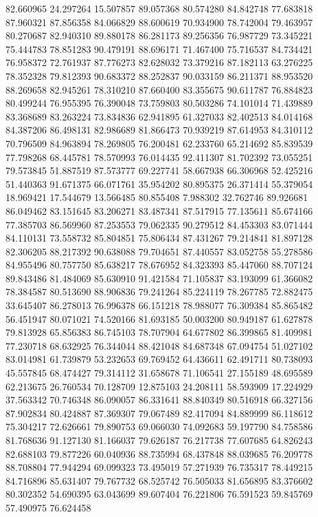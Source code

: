82.660965
24.297264
15.507857
89.057368
80.574280
84.842748
77.683818
87.960321
87.856358
84.066829
88.600619
70.934900
78.742004
79.463957
80.270687
82.940310
89.880178
86.281173
89.256356
76.987729
73.345221
75.444783
78.851283
90.479191
88.696171
71.467400
75.716537
84.734421
76.958372
72.761937
87.776273
82.628032
73.379216
87.182113
63.276225
78.352328
79.812393
90.683372
88.252837
90.033159
86.211371
88.953520
88.269658
82.945261
78.310210
87.660400
83.355675
90.611787
76.884823
80.499244
76.955395
76.390048
73.759803
80.503286
74.101014
71.439889
83.368689
83.263224
73.834836
62.941895
61.327033
82.402513
84.014168
84.387206
86.498131
82.986689
81.866473
70.939219
87.614953
84.310112
70.796509
84.963894
78.269805
76.200481
62.233760
65.214692
85.839539
77.798268
68.445781
78.570993
76.014435
92.411307
81.702392
73.055251
79.573845
51.887519
87.573777
69.227741
58.667938
66.306968
52.425216
51.440363
91.671375
66.071761
35.954202
80.895375
26.371414
55.379054
18.969421
17.544679
13.566485
80.855408
7.988302
32.762746
89.926681
86.049462
83.151645
83.206271
83.487341
87.517915
77.135611
85.674166
77.385703
86.569960
87.253553
79.062335
90.279512
84.453303
83.071444
84.110131
73.558732
85.804851
75.806434
87.431267
79.214841
81.897128
82.306205
88.217392
90.638088
79.704651
87.440557
83.052758
55.278586
84.955496
80.757750
85.638217
78.676952
84.323393
85.447060
88.707124
89.843486
81.484069
85.630910
91.421584
71.105837
83.193099
61.366082
78.384587
80.513690
88.906836
79.241264
85.224119
78.267785
72.882475
33.645407
86.278013
76.996378
66.151218
78.988077
76.309384
85.865482
56.451947
80.071021
74.520166
81.693185
50.003200
80.949187
61.627878
79.813928
65.856383
86.745103
78.707904
64.677802
86.399865
81.409981
77.230718
68.632925
76.344044
88.421048
84.687348
67.094754
51.027102
83.014981
61.739879
53.232653
69.769452
64.436611
62.491711
80.738093
45.557845
68.474427
79.314112
31.658678
71.106541
27.155189
48.695589
62.213675
26.760534
70.128709
12.875103
24.208111
58.593909
17.224929
37.563342
70.746348
86.090057
86.331641
88.840349
80.516918
66.327156
87.902834
80.424887
87.369307
79.067489
82.417094
84.889999
86.118612
75.304217
72.626661
79.890753
69.066030
74.092683
59.197790
84.758586
81.768636
91.127130
81.166037
79.626187
76.217738
77.607685
64.826243
82.688103
79.877226
60.040936
88.735994
68.437848
88.039685
76.209778
88.708804
77.944294
69.099323
73.495019
57.271939
76.735317
78.449215
84.716896
85.631407
79.767732
68.525742
76.505033
81.656895
83.376602
80.302352
54.690395
63.043699
89.607404
76.221806
76.591523
59.845769
57.490975
76.624458
